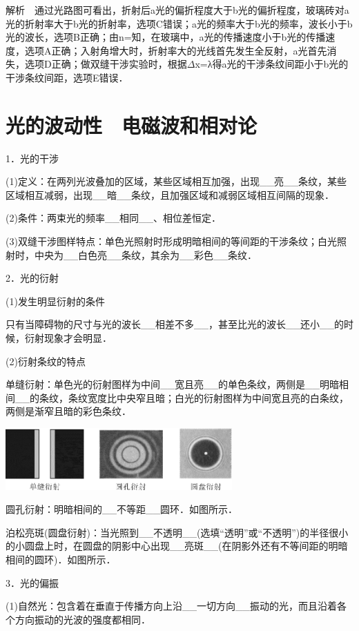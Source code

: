 解析　通过光路图可看出，折射后a光的偏折程度大于b光的偏折程度，玻璃砖对a光的折射率大于b光的折射率，选项C错误；a光的频率大于b光的频率，波长小于b光的波长，选项B正确；由n=知，在玻璃中，a光的传播速度小于b光的传播速度，选项A正确；入射角增大时，折射率大的光线首先发生全反射，a光首先消失，选项D正确；做双缝干涉实验时，根据$\Delta$x=λ得a光的干涉条纹间距小于b光的干涉条纹间距，选项E错误．

\section{光的波动性　电磁波和相对论}



1．光的干涉

(1)定义：在两列光波叠加的区域，某些区域相互加强，出现\_\_亮\_\_条纹，某些区域相互减弱，出现\_\_暗\_\_条纹，且加强区域和减弱区域相互间隔的现象．

(2)条件：两束光的频率\_\_相同\_\_、相位差恒定．

(3)双缝干涉图样特点：单色光照射时形成明暗相间的等间距的干涉条纹；白光照射时，中央为\_\_白色亮\_\_条纹，其余为\_\_彩色\_\_条纹．

2．光的衍射

(1)发生明显衍射的条件

只有当障碍物的尺寸与光的波长\_\_相差不多\_\_，甚至比光的波长\_\_还小\_\_的时候，衍射现象才会明显．

(2)衍射条纹的特点

单缝衍射：单色光的衍射图样为中间\_\_宽且亮\_\_的单色条纹，两侧是\_\_明暗相间\_\_的条纹，条纹宽度比中央窄且暗；白光的衍射图样为中间宽且亮的白条纹，两侧是渐窄且暗的彩色条纹．

\begin{center}\includegraphics[width=3.41528in,height=0.93403in]{media/image557.png}\end{center}
圆孔衍射：明暗相间的\_\_不等距\_\_圆环．如图所示．

泊松亮斑(圆盘衍射)：当光照到\_\_不透明\_\_(选填``透明''或``不透明'')的半径很小的小圆盘上时，在圆盘的阴影中心出现\_\_亮斑\_\_(在阴影外还有不等间距的明暗相间的圆环)．如图所示．

3．光的偏振

(1)自然光：包含着在垂直于传播方向上沿\_\_一切方向\_\_振动的光，而且沿着各个方向振动的光波的强度都相同．

